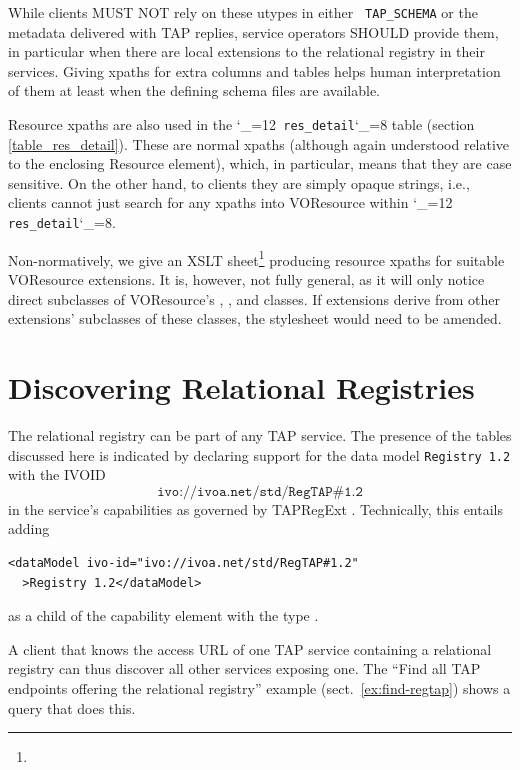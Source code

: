 \documentclass[11pt,a4paper]{ivoa}
\makeatletter
\def\rtent#1{\texttt{\color{rtcolor}\verb|#1|}}
\def\makeunderscoreletter{\catcode`\_=12}
\def\makeunderscoresubscript{\catcode`\_=8}
\def\rtent{\makeunderscoreletter\relax\rt@nt}
\def\rt@nt#1{\texttt{\color{rtcolor} #1}\makeunderscoresubscript{}}
\newcommand{\tapent}[1]{\texttt{\color{tapcolor} #1}}
\makeatother
\begin{document}
While clients MUST NOT rely on these utypes in either
\tapent{TAP\_SCHEMA} or the
metadata delivered with TAP replies, service operators SHOULD provide them, in
particular when there are local extensions to the relational registry in their
services.  Giving xpaths for extra columns and tables helps human
interpretation of them at least when the defining schema files are
available.

Resource xpaths are also used in the \rtent{res_detail} table (section
\ref{table_res_detail}).  These are normal xpaths
(although again understood relative to the enclosing Resource element),
which, in particular, means that they are case sensitive.  On the other
hand, to clients they are simply opaque strings, i.e., clients cannot
just search for any xpaths into VOResource within \rtent{res_detail}.

Non-normatively, we give an XSLT
sheet\footnote{} producing resource xpaths
for suitable VOResource extensions. It is, however, not fully general,
as it will only notice direct subclasses of VOResource's
, , and  classes.
If extensions derive from other extensions' subclasses of these classes,
the stylesheet would need to be amended.

\section{Discovering Relational Registries}

\label{registration}

The relational registry can be part of any TAP service.  The presence
of the tables discussed here is indicated by declaring support for the
data model \texttt{Registry 1.2} with the IVOID
$$\texttt{ivo://ivoa.net/std/RegTAP\#1.2}$$ in the service's
capabilities as governed by TAPRegExt \citep{2012ivoa.spec.0827D}.  Technically, this
entails adding


\begin{verbatim}
<dataModel ivo-id="ivo://ivoa.net/std/RegTAP#1.2"
  >Registry 1.2</dataModel>
\end{verbatim}

as a child of the capability element with the type
.

A client that knows the access URL of one TAP service containing
a relational
registry can thus discover all other services exposing one. The
``Find all TAP endpoints offering the
relational registry'' example (sect.~\ref{ex:find-regtap})
shows a query that does
this.
\end{document}
